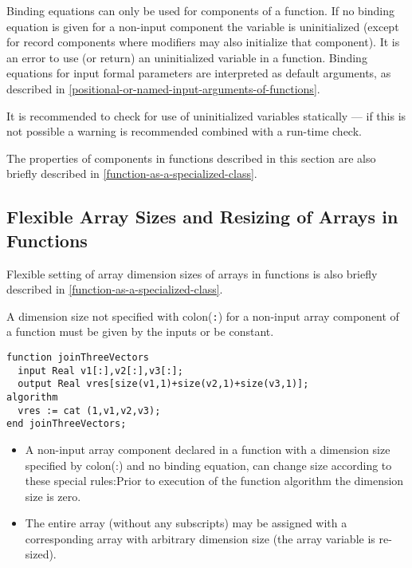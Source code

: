 Binding equations can only be used for components of a function.
If no binding equation is given for a non-input component the
variable is uninitialized (except for record components where modifiers
may also initialize that component). It is an error to use (or return)
an uninitialized variable in a function.  Binding equations for input
formal parameters are interpreted as default arguments, as described in
\autoref{positional-or-named-input-arguments-of-functions}.

\begin{nonnormative}
It is recommended to check for use of uninitialized variables statically --- if this is not possible a warning is recommended
combined with a run-time check.
\end{nonnormative}

\begin{nonnormative}
The properties of components in functions described in this
section are also briefly described in \autoref{function-as-a-specialized-class}.
\end{nonnormative}

\subsection{Flexible Array Sizes and Resizing of Arrays in Functions}

\begin{nonnormative}
Flexible setting of array dimension sizes of arrays in
functions is also briefly described in \autoref{function-as-a-specialized-class}.
\end{nonnormative}

A dimension size not specified with colon(\lstinline!:!) for a non-input array
component of a function must be given by the inputs or be constant.

\begin{example}
\begin{lstlisting}[language=modelica]
function joinThreeVectors
  input Real v1[:],v2[:],v3[:];
  output Real vres[size(v1,1)+size(v2,1)+size(v3,1)];
algorithm
  vres := cat (1,v1,v2,v3);
end joinThreeVectors;
\end{lstlisting}
\end{example}

\begin{itemize}
\item
  A non-input array component declared in a function with a dimension
  size specified by colon(:) and no binding equation, can change
  size according to these special rules:Prior to execution of the
  function algorithm the dimension size is zero.
\item
  The entire array (without any subscripts) may be assigned with a
  corresponding array with arbitrary dimension size (the array variable
  is re-sized).
\end{itemize}

